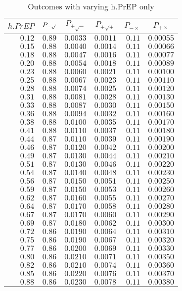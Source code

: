 %
\begin{table}[\hbtp]
 \small
 \begin{center}
 \begin{tabular}{rrrrrr}\hline\hline
\multicolumn{1}{c}{$h.PrEP$}&\multicolumn{1}{c}{$P_{-\surd}$}&\multicolumn{1}{c}{$P_{+\surd - }$}&\multicolumn{1}{c}{$P_{+\surd +}$}&\multicolumn{1}{c}{$P_{-\times}$}&\multicolumn{1}{c}{$P_{+\times}$}\tabularnewline
\hline
$0.12$&$0.89$&$0.0033$&$0.0011$&$0.11$&$0.00055$\tabularnewline
$0.15$&$0.88$&$0.0040$&$0.0014$&$0.11$&$0.00066$\tabularnewline
$0.18$&$0.88$&$0.0047$&$0.0016$&$0.11$&$0.00077$\tabularnewline
$0.20$&$0.88$&$0.0054$&$0.0018$&$0.11$&$0.00089$\tabularnewline
$0.23$&$0.88$&$0.0060$&$0.0021$&$0.11$&$0.00100$\tabularnewline
$0.25$&$0.88$&$0.0067$&$0.0023$&$0.11$&$0.00110$\tabularnewline
$0.28$&$0.88$&$0.0074$&$0.0025$&$0.11$&$0.00120$\tabularnewline
$0.31$&$0.88$&$0.0081$&$0.0028$&$0.11$&$0.00130$\tabularnewline
$0.33$&$0.88$&$0.0087$&$0.0030$&$0.11$&$0.00150$\tabularnewline
$0.36$&$0.88$&$0.0094$&$0.0032$&$0.11$&$0.00160$\tabularnewline
$0.38$&$0.88$&$0.0100$&$0.0035$&$0.11$&$0.00170$\tabularnewline
$0.41$&$0.88$&$0.0110$&$0.0037$&$0.11$&$0.00180$\tabularnewline
$0.44$&$0.87$&$0.0110$&$0.0039$&$0.11$&$0.00190$\tabularnewline
$0.46$&$0.87$&$0.0120$&$0.0042$&$0.11$&$0.00200$\tabularnewline
$0.49$&$0.87$&$0.0130$&$0.0044$&$0.11$&$0.00210$\tabularnewline
$0.51$&$0.87$&$0.0130$&$0.0046$&$0.11$&$0.00220$\tabularnewline
$0.54$&$0.87$&$0.0140$&$0.0048$&$0.11$&$0.00230$\tabularnewline
$0.56$&$0.87$&$0.0150$&$0.0051$&$0.11$&$0.00250$\tabularnewline
$0.59$&$0.87$&$0.0150$&$0.0053$&$0.11$&$0.00260$\tabularnewline
$0.62$&$0.87$&$0.0160$&$0.0055$&$0.11$&$0.00270$\tabularnewline
$0.64$&$0.87$&$0.0170$&$0.0058$&$0.11$&$0.00280$\tabularnewline
$0.67$&$0.87$&$0.0170$&$0.0060$&$0.11$&$0.00290$\tabularnewline
$0.69$&$0.87$&$0.0180$&$0.0062$&$0.11$&$0.00300$\tabularnewline
$0.72$&$0.86$&$0.0190$&$0.0064$&$0.11$&$0.00310$\tabularnewline
$0.75$&$0.86$&$0.0190$&$0.0067$&$0.11$&$0.00320$\tabularnewline
$0.77$&$0.86$&$0.0200$&$0.0069$&$0.11$&$0.00330$\tabularnewline
$0.80$&$0.86$&$0.0210$&$0.0071$&$0.11$&$0.00350$\tabularnewline
$0.82$&$0.86$&$0.0210$&$0.0074$&$0.11$&$0.00360$\tabularnewline
$0.85$&$0.86$&$0.0220$&$0.0076$&$0.11$&$0.00370$\tabularnewline
$0.88$&$0.86$&$0.0230$&$0.0078$&$0.11$&$0.00380$\tabularnewline
\hline
\end{tabular}

\end{center}

\caption{Outcomes with varying h.PrEP only\label{tbl:h.PrEP_varying_only}} 

\end{table}

